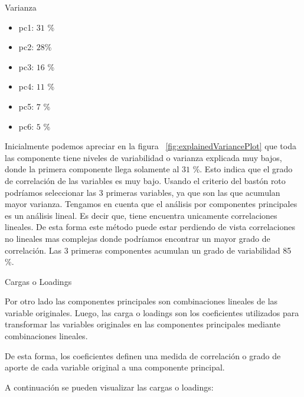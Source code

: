 \documentclass[11pt,a4paper,twoside]{thesis}
\begin{document}
\begin{description}
	\item[Varianza]
\end{description}
\begin{itemize}
	\item pc1: $31$ \%
	\item pc2: $28$\%
	\item pc3: $16$ \%
	\item pc4: $11$ \%
	\item pc5: $7$ \%
	\item pc6: $5$ \%
\end{itemize}

Inicialmente podemos apreciar en la figura ~\ref{fig:explainedVariancePlot} que toda las componente tiene niveles de variabilidad o varianza explicada muy bajos, donde la primera componente llega solamente al $31$ \%. Esto indica que el grado de correlación de las variables es muy bajo. Usando el criterio del bastón roto podríamos seleccionar las 3 primeras variables, ya que son las que acumulan mayor varianza. Tengamos en cuenta que el análisis por componentes principales es un análisis lineal. Es decir que, tiene encuentra unicamente correlaciones lineales. De esta forma este método puede estar perdiendo de vista correlaciones no lineales mas complejas donde podríamos encontrar un mayor grado de correlación. Las 3 primeras componentes acumulan un grado de variabilidad 85 \%.


\begin{description}
	\item[Cargas o Loadings]
\end{description}

Por otro lado las componentes principales son combinaciones lineales de las variable originales. Luego, las carga o loadings son los coeficientes utilizados para transformar las variables originales en las componentes principales mediante combinaciones lineales.

De esta forma, los coeficientes definen una medida de correlación o grado de aporte de cada variable original a una componente principal.

A continuación se pueden visualizar las cargas o loadings:
\end{document}
